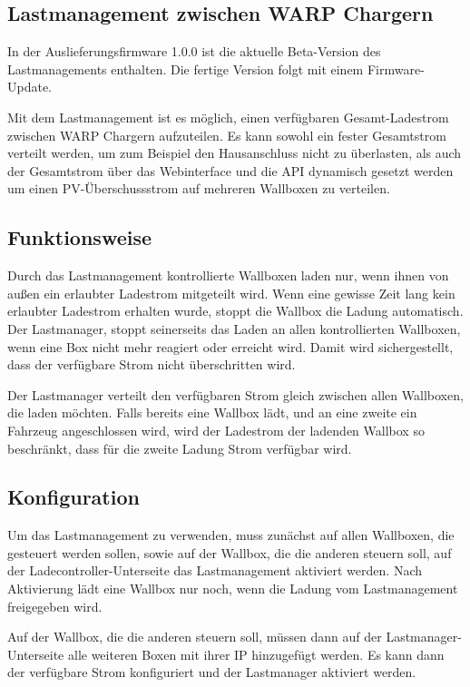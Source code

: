 \documentclass[a4paper,10pt]{article}
\newcommand{\hint}[1]{\begin{tcolorbox}[colback=boxgray,colframe=black,coltext=
white,title=Hinweis]#1\end{tcolorbox}}
\begin{document}
\begin{multicols*}{2}
	\newpage
	\section{Lastmanagement zwischen WARP Chargern}\label{charge_manager}
	\hint{In der Auslieferungsfirmware 1.0.0 ist die aktuelle Beta-Version des Lastmanagements enthalten.
	Die fertige Version folgt mit einem Firmware-Update.}
	Mit dem Lastmanagement ist es möglich, einen verfügbaren Gesamt-Ladestrom zwischen WARP Chargern aufzuteilen.
	Es kann sowohl ein fester Gesamtstrom verteilt werden, um zum Beispiel den Hausanschluss nicht zu überlasten,
	als auch der Gesamtstrom über das Webinterface und die API dynamisch gesetzt werden
	um einen PV-Überschussstrom auf mehreren Wallboxen zu verteilen.

	\subsection{Funktionsweise}
	Durch das Lastmanagement kontrollierte Wallboxen laden nur,
	wenn ihnen von außen ein erlaubter Ladestrom mitgeteilt wird. Wenn eine gewisse Zeit lang
	kein erlaubter Ladestrom erhalten wurde, stoppt die Wallbox die Ladung automatisch.
	Der Lastmanager, stoppt seinerseits das Laden an allen kontrollierten Wallboxen,
	wenn eine Box nicht mehr reagiert oder erreicht wird. Damit wird sichergestellt,
	dass der verfügbare Strom nicht überschritten wird.

	Der Lastmanager verteilt den verfügbaren Strom gleich zwischen allen Wallboxen, die laden möchten.
	Falls bereits eine Wallbox lädt, und an eine zweite ein Fahrzeug angeschlossen wird,
	wird der Ladestrom der ladenden Wallbox so beschränkt, dass für die zweite Ladung Strom verfügbar wird.

	\subsection{Konfiguration}
	Um das Lastmanagement zu verwenden, muss zunächst auf allen Wallboxen, die gesteuert werden sollen,
	sowie auf der Wallbox, die die anderen steuern soll, auf der Ladecontroller-Unterseite
	das Lastmanagement aktiviert werden. Nach Aktivierung lädt eine Wallbox nur noch,
	wenn die Ladung vom Lastmanagement freigegeben wird.

	Auf der Wallbox, die die anderen steuern soll, müssen dann auf der Lastmanager-Unterseite
	alle weiteren Boxen mit ihrer IP hinzugefügt werden.
	Es kann dann der verfügbare Strom konfiguriert und der Lastmanager aktiviert werden.


\end{multicols*}
\end{document}

